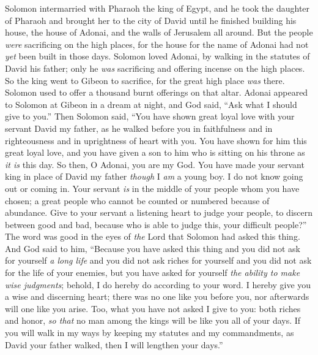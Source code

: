 \begin{biblechapter} %
 Solomon intermarried with Pharaoh the king of Egypt, and he took the daughter of Pharaoh and brought her to the city of David until he finished building his house, the house of Adonai, and the walls of Jerusalem all around.
\verse But the people \textit{were} sacrificing on the high places, for the house for the name of Adonai had not \textit{yet} been built in those days.
\verse Solomon loved Adonai, by walking in the statutes of David his father; only he \textit{was} sacrificing and offering incense on the high places.
\verse So the king went to Gibeon to sacrifice, for the great high place \textit{was} there. Solomon used to offer a thousand burnt offerings on that altar.
 Adonai appeared to Solomon at Gibeon in a dream at night, and God said, “Ask what I should give to you.”
\verse Then Solomon said, “You have shown great loyal love with your servant David my father, as he walked before you in faithfulness and in righteousness and in uprightness of heart with you. You have shown for him this great loyal love, and you have given a son to him who is sitting on his throne as \textit{it is} this day.
\verse So then, O Adonai, you are my God. You have made your servant king in place of David my father \textit{though} I \textit{am} a young boy. I do not know going out or coming in.
\verse Your servant \textit{is} in the middle of your people whom you have chosen; a great people who cannot be counted or numbered because of abundance.
\verse Give to your servant a listening heart to judge your people, to discern between good and bad, because who is able to judge this, your difficult people?”
\verse The word was good in the eyes of \textit{the} Lord that Solomon had asked this thing.
\verse And God said to him, “Because you have asked this thing and you did not ask for yourself \textit{a long life} and you did not ask riches for yourself and you did not ask for the life of your enemies, but you have asked for yourself \textit{the ability to make wise judgments};
\verse behold, I do hereby do according to your word. I hereby give you a wise and discerning heart; there was no one like you before you, nor afterwards will one like you arise.
\verse Too, what you have not asked I give to you: both riches and honor, \textit{so that} no man among the kings will be like you all of your days.
\verse If you will walk in my ways by keeping my statutes and my commandments, as David your father walked, then I will lengthen your days.”

\end{biblechapter}
